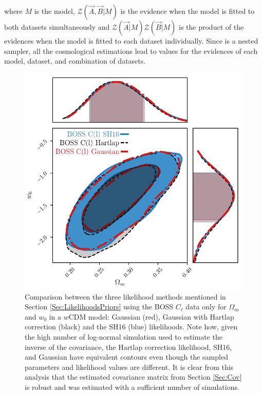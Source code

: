 \noindent where $M$ is the model, $\mathcal{Z}(\vec{A},\vec{B}|M)$ is the evidence when the model is fitted to both datasets simultaneously and $\mathcal{Z}(\vec{A}|M)\mathcal{Z}(\vec{B}|M)$ is the product of the evidences when the model is fitted to each dataset individually. Since \pliny is a nested sampler, all the cosmological estimations lead to values for the evidences of each model, dataset, and combination of datasets.


\begin{figure}
\begin{center}
\includegraphics[scale=0.80]{BOSS-FIGS/likelihood_comparisonOmega_cdm_w0.pdf}
\caption[Comparison between the three likelihood methods mentioned in Section \ref{Sec:LikelihoodsPriors} using the BOSS $C_{\ell}$ data only for $\Omega_{m}$ and $w_0$.]{Comparison between the three likelihood methods mentioned in Section \ref{Sec:LikelihoodsPriors} using the BOSS $C_{\ell}$ data only for $\Omega_{m}$ and $w_0$ in a $w$CDM model: Gaussian (red), Gaussian with Hartlap correction (black) and the SH16 (blue) likelihoods. Note how, given the high number of log-normal simulation used to estimate the inverse of the covariance, the Hartlap correction likelihood, SH16, and Gaussian have equivalent contours even though the sampled parameters and likelihood values are different. It is clear from this analysis that the estimated covariance matrix from Section \ref{Sec:Cov} is robust and was estimated with a sufficient number of simulations.}
\label{fig:LikelihoodCompare}
\end{center}
\end{figure}

